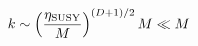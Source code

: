 \begin{equation}
    \label{keta}
    k\sim \left({\eta_{\rm SUSY}\over M}\right)^{(D+1)/2} M \ll M
\end{equation}

